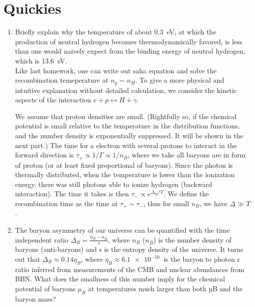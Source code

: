 \section{Quickies}
\begin{enumerate}[label=\alph*)]
	\item Briefly explain why the temperature of about \SI{0.3}{eV}, at which the production of neutral hydrogen becomes thermodynamically favored, is less than one would naively expect from the binding energy of neutral hydrogen, which is \SI{13.6}{eV}.\\

      Like last homework, one can write out saha equation and solve the recombination temeperature at $n_p \sim n_H$. To give a more physical and intuitive explanation without detailed calculation, we consider the kinetic aspects of the interaction $e + p  \leftrightarrow H + \gamma$.

      We assume that proton densities are small. (Rightfully so, if the chemical potential is small relative to the temperature in the distribution functions, and the number density is exponentially suppressed. It will be shown in the next part.) The time for a electron with several protons to interact in the forward direction is $\tau_+ \propto 1/\Gamma \propto 1/n_B$, where we take all baryons are in form of proton (or at least fixed proportional of baryons). Since the photon is thermally distributed, when the temperature is lower than the ionization energy, there was still photons able to ionize hydrogen (backward interaction). The time it takes is then $\tau_- \propto e^{\Delta_H / T}$. We define the recombination time as the time at $\tau_+ \sim \tau_-$, thus for small $n_B$, we have $\Delta \gg T$.
	
	\item The baryon asymmetry of our universe can be quantified with the time independent	ratio $\Delta_B = \frac{n_B - n_{\bar{B}} }{s} $, where $n_B$ ($n_{\bar{B}}$) is the number density of baryons (anti-baryons)	and s is the entropy density of the universe. It turns out that $\Delta_B \approx 0.14 \eta_B$, where $\eta_B \approx \SI{6.1e-10}{}$ is the baryon to photon r ratio inferred from measurements of the	CMB and nuclear abundances from BBN. What does the smallness of this number imply for the chemical potential of baryons $\mu_B$ at temperatures much larger than both µB and the baryon mass? \\


\end{enumerate}
